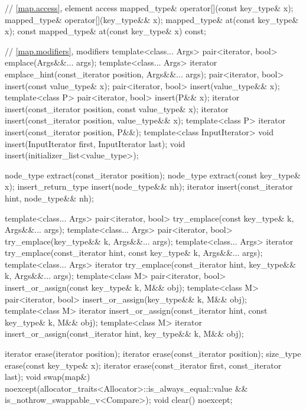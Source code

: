 \documentclass{wg21}
\begin{document}
\begin{codeblock}
{{        // \ref{map.access}, element access
        mapped_type& operator[](const key_type& x);
        mapped_type& operator[](key_type&& x);
        mapped_type&       at(const key_type& x);
        const mapped_type& at(const key_type& x) const;

        // \ref{map.modifiers}, modifiers
        template<class... Args> pair<iterator, bool> emplace(Args&&... args);
        template<class... Args> iterator emplace_hint(const_iterator position, Args&&... args);
        pair<iterator, bool> insert(const value_type& x);
        pair<iterator, bool> insert(value_type&& x);
        template<class P> pair<iterator, bool> insert(P&& x);
        iterator insert(const_iterator position, const value_type& x);
        iterator insert(const_iterator position, value_type&& x);
        template<class P>
        iterator insert(const_iterator position, P&&);
        template<class InputIterator>
        void insert(InputIterator first, InputIterator last);
        void insert(initializer_list<value_type>);

        node_type extract(const_iterator position);
        node_type extract(const key_type& x);
        insert_return_type insert(node_type&& nh);
        iterator           insert(const_iterator hint, node_type&& nh);

        template<class... Args>
        pair<iterator, bool> try_emplace(const key_type& k, Args&&... args);
        template<class... Args>
        pair<iterator, bool> try_emplace(key_type&& k, Args&&... args);
        template<class... Args>
        iterator try_emplace(const_iterator hint, const key_type& k, Args&&... args);
        template<class... Args>
        iterator try_emplace(const_iterator hint, key_type&& k, Args&&... args);
        template<class M>
        pair<iterator, bool> insert_or_assign(const key_type& k, M&& obj);
        template<class M>
        pair<iterator, bool> insert_or_assign(key_type&& k, M&& obj);
        template<class M>
        iterator insert_or_assign(const_iterator hint, const key_type& k, M&& obj);
        template<class M>
        iterator insert_or_assign(const_iterator hint, key_type&& k, M&& obj);

        iterator  erase(iterator position);
        iterator  erase(const_iterator position);
        size_type erase(const key_type& x);
        iterator  erase(const_iterator first, const_iterator last);
        void      swap(map&)
        noexcept(allocator_traits<Allocator>::is_always_equal::value &&
        is_nothrow_swappable_v<Compare>);
        void      clear() noexcept;

}}
\end{codeblock}
\end{document}
